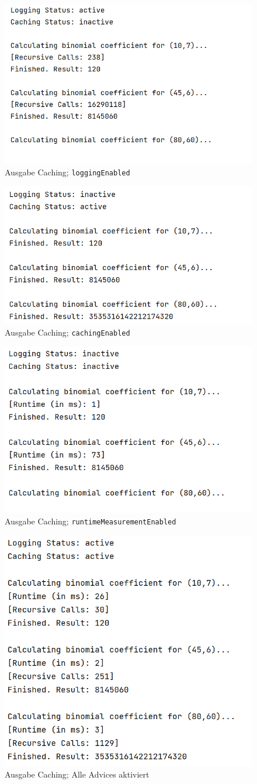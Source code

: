 \documentclass[german,notitlepage,smartquotes]{hgbreport}
\begin{document}
\begin{figure}[h]
\centering
\includegraphics[width=.5\textwidth]{caching-test-01}
\caption{Ausgabe Caching; \texttt{loggingEnabled}}
\label{caching-test-01}
\end{figure}

\begin{figure}[h]
\centering
\includegraphics[width=.5\textwidth]{caching-test-02}
\caption{Ausgabe Caching; \texttt{cachingEnabled}}
\label{caching-test-02}
\end{figure}

\begin{figure}[h]
\centering
\includegraphics[width=.5\textwidth]{caching-test-03}
\caption{Ausgabe Caching; \texttt{runtimeMeasurementEnabled}}
\label{caching-test-03}
\end{figure}

\begin{figure}[h]
\centering
\includegraphics[width=.5\textwidth]{caching-test-04}
\caption{Ausgabe Caching; Alle Advices aktiviert}
\label{caching-test-04}
\end{figure}
\end{document}
